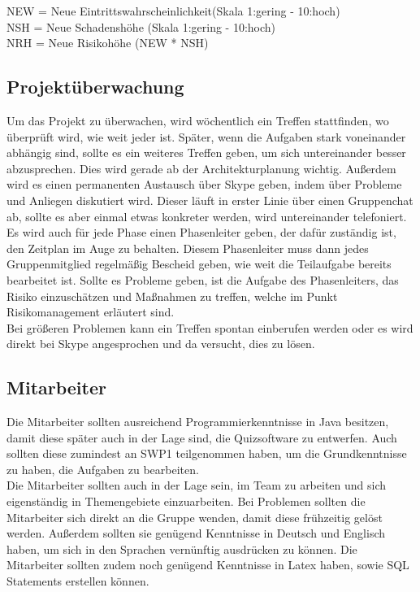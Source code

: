 \documentclass[fontsize=12pt,paper=a4,twoside]{scrartcl}
\begin{document}
NEW = Neue Eintrittswahrscheinlichkeit(Skala 1:gering - 10:hoch)\\
NSH = Neue Schadenshöhe (Skala 1:gering - 10:hoch)\\
NRH = Neue Risikohöhe (NEW * NSH)\\


\subsection{Projektüberwachung}\label{3.4-controlling}

Um das Projekt zu überwachen, wird wöchentlich ein Treffen stattfinden, wo überprüft wird, wie weit jeder ist. Später, wenn die Aufgaben stark voneinander abhängig sind, sollte es ein weiteres Treffen geben, um sich untereinander besser abzusprechen. Dies wird gerade ab der Architekturplanung wichtig. Außerdem wird es einen permanenten Austausch über Skype geben, indem über Probleme und Anliegen diskutiert wird. Dieser läuft in erster Linie über einen Gruppenchat ab, sollte es aber einmal etwas konkreter werden, wird untereinander telefoniert. \\
Es wird auch für jede Phase einen Phasenleiter geben, der dafür zuständig ist, den Zeitplan im Auge zu behalten. Diesem Phasenleiter muss dann jedes Gruppenmitglied regelmäßig Bescheid geben, wie weit die Teilaufgabe bereits bearbeitet ist. Sollte es Probleme geben, ist die Aufgabe des Phasenleiters, das Risiko einzuschätzen und Maßnahmen zu treffen, welche im Punkt Risikomanagement erläutert sind.\\
Bei größeren Problemen kann ein Treffen spontan einberufen werden oder es wird direkt bei Skype angesprochen und da versucht, dies zu lösen.

\subsection{Mitarbeiter}

Die Mitarbeiter sollten ausreichend Programmierkenntnisse in Java besitzen, damit diese später auch in der Lage sind, die Quizsoftware zu entwerfen. Auch sollten diese zumindest an SWP1 teilgenommen haben, um die Grundkenntnisse zu haben, die Aufgaben zu bearbeiten. \\
Die Mitarbeiter sollten auch in der Lage sein, im Team zu arbeiten und sich eigenständig in Themengebiete einzuarbeiten. Bei Problemen sollten die Mitarbeiter sich direkt an die Gruppe wenden, damit diese frühzeitig gelöst werden. Außerdem sollten sie genügend Kenntnisse in Deutsch und Englisch haben, um sich in den Sprachen vernünftig ausdrücken zu können. Die Mitarbeiter sollten zudem noch genügend Kenntnisse in Latex haben, sowie SQL Statements erstellen können. 
\end{document}
